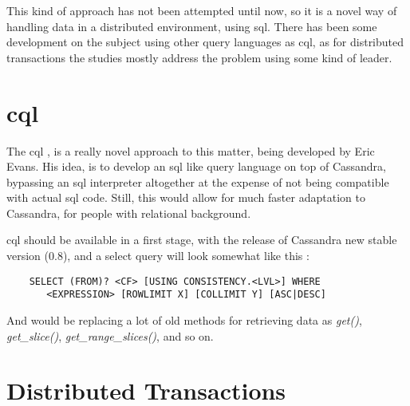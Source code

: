 This kind of approach has not been attempted until now, so it is a novel way of handling data in a distributed environment, using \ac{sql}. There has been some development on the subject using other query languages as \ac{cql}, as for distributed transactions the studies mostly address the problem using some kind of leader. 


\section{\ac{cql}}

The \ac{cql} \cite{cql}, is a really novel approach to this matter, being developed by Eric Evans. His idea, is to develop an \ac{sql} like query language on top of Cassandra, bypassing an \ac{sql} interpreter altogether at the expense of not being compatible with actual \ac{sql}  code. Still, this would allow for much faster adaptation to Cassandra, for people with relational background. 

\ac{cql} should be available in a first stage, with the release of Cassandra new stable version (0.8), and a select query will look somewhat like this \cite{cqlSelect}:

\begin{center}
\begin{verbatim}
    SELECT (FROM)? <CF> [USING CONSISTENCY.<LVL>] WHERE 
       <EXPRESSION> [ROWLIMIT X] [COLLIMIT Y] [ASC|DESC]
\end{verbatim}
\end{center}

And would be replacing a lot of old methods for retrieving data as \emph{get()}, \emph{get\_slice()}, \emph{get\_range\_slices()}, and so on.	

\section{Distributed Transactions}


